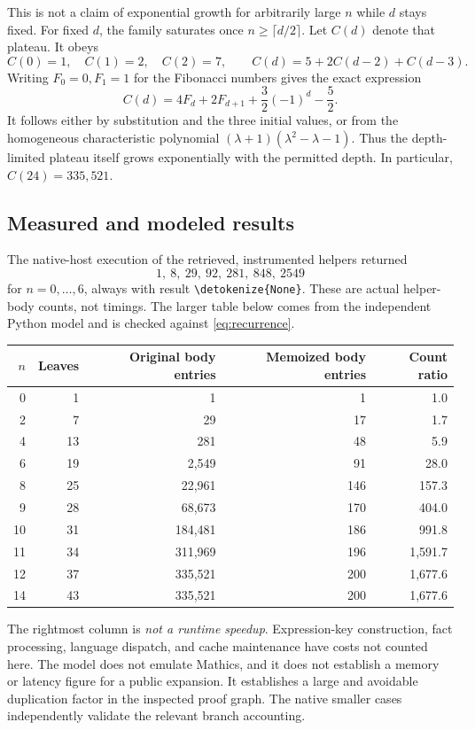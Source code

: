 \documentclass[11pt,letterpaper]{article}
\newcommand{\code}[1]{\expandafter\nolinkurl\expandafter{\detokenize{#1}}}
\begin{document}
This is not a claim of exponential growth for arbitrarily large $n$ while $d$ stays fixed. For fixed $d$, the family saturates once $n\geq\lceil d/2\rceil$. Let $C(d)$ denote that plateau. It obeys
\[
 C(0)=1,\quad C(1)=2,\quad C(2)=7,\qquad
 C(d)=5+2C(d-2)+C(d-3).
\]
Writing $F_0=0,F_1=1$ for the Fibonacci numbers gives the exact expression
\begin{equation}
 C(d)=4F_d+2F_{d+1}+\frac32(-1)^d-\frac52.
 \label{eq:fibonacci}
\end{equation}
It follows either by substitution and the three initial values, or from the homogeneous characteristic polynomial $(\lambda+1)(\lambda^2-\lambda-1)$. Thus the depth-limited plateau itself grows exponentially with the permitted depth. In particular, $C(24)=335{,}521$.

\subsection{Measured and modeled results}

The native-host execution of the retrieved, instrumented helpers returned
\[
 1,\ 8,\ 29,\ 92,\ 281,\ 848,\ 2549
\]
for $n=0,\ldots,6$, always with result \code{None}. These are actual helper-body counts, not timings. The larger table below comes from the independent Python model and is checked against \eqref{eq:recurrence}.

\begin{center}\small
\begin{tabular}{@{}rrrrr@{}}
\toprule
$n$ & Leaves & Original body entries & Memoized body entries & Count ratio\\
\midrule
0 & 1 & 1 & 1 & 1.0\\
2 & 7 & 29 & 17 & 1.7\\
4 & 13 & 281 & 48 & 5.9\\
6 & 19 & 2,549 & 91 & 28.0\\
8 & 25 & 22,961 & 146 & 157.3\\
9 & 28 & 68,673 & 170 & 404.0\\
10 & 31 & 184,481 & 186 & 991.8\\
11 & 34 & 311,969 & 196 & 1,591.7\\
12 & 37 & 335,521 & 200 & 1,677.6\\
14 & 43 & 335,521 & 200 & 1,677.6\\
\bottomrule
\end{tabular}
\end{center}

The rightmost column is \emph{not a runtime speedup}. Expression-key construction, fact processing, language dispatch, and cache maintenance have costs not counted here. The model does not emulate Mathics, and it does not establish a memory or latency figure for a public expansion. It establishes a large and avoidable duplication factor in the inspected proof graph. The native smaller cases independently validate the relevant branch accounting.
\end{document}
